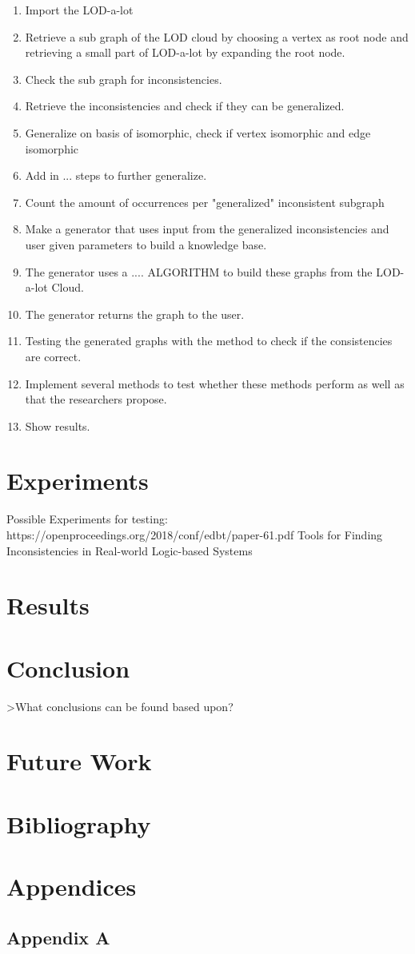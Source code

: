 \documentclass{article}
\begin{document}
\begin{enumerate}
	\item Import the LOD-a-lot
	\item Retrieve a sub graph of the LOD cloud by choosing a vertex as root node and retrieving a small part of LOD-a-lot by expanding the root node.
	\item Check the sub graph for inconsistencies. 
	\item Retrieve the inconsistencies and check if they can be generalized.
	\item Generalize on basis of isomorphic, check if vertex isomorphic and edge isomorphic
	\item Add in ... steps to further generalize.
	\item Count the amount of occurrences per "generalized" inconsistent subgraph
	\item Make a generator that uses input from the generalized inconsistencies and user given parameters to build a knowledge base.
	\item The generator uses a .... ALGORITHM to build these graphs from the LOD-a-lot Cloud.
	\item The generator returns the graph to the user.
	\item Testing the generated graphs with the method to check if the consistencies are correct. 
	\item Implement several methods to test whether these methods perform as well as that the researchers propose.
	\item Show results.
\end{enumerate}


\newpage
\section{Experiments}
Possible Experiments for testing:
https://openproceedings.org/2018/conf/edbt/paper-61.pdf
Tools for Finding Inconsistencies in Real-world Logic-based Systems


\newpage
\section{Results}


\newpage
\section{Conclusion}
>What conclusions can be found based upon?


\section{Future Work}

\newpage
\section{Bibliography}


\newpage
\section{Appendices}
\subsection{Appendix A}
\end{document}
